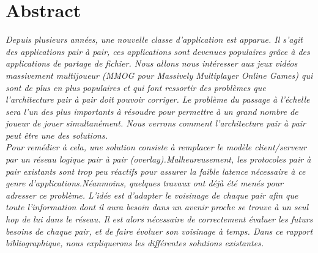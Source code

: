 \section{Abstract}
	\textit{Depuis plusieurs années, une nouvelle classe d'application est apparue. Il s'agit des applications pair à pair, ces applications sont devenues populaires grâce à des applications de partage de fichier. Nous allons nous intéresser aux jeux vidéos massivement multijoueur (MMOG pour Massively Multiplayer Online Games) qui sont de plus en plus populaires et qui font ressortir des problèmes que l'architecture pair à pair doit pouvoir corriger. Le problème du passage à l'échelle sera l'un des plus importants à résoudre pour permettre à un grand nombre de joueur de jouer simultanément. Nous verrons comment l'architecture pair à pair peut être une des solutions.\\ 
	Pour remédier à cela, une solution consiste à remplacer le modèle client/serveur par un réseau logique pair à pair (overlay).Malheureusement, les protocoles pair à pair existants sont trop peu réactifs pour assurer la faible latence nécessaire à ce genre d’applications.Néanmoins, quelques travaux ont déjà été menés pour adresser ce problème. L’idée est d’adapter le voisinage de chaque pair afin que toute l’information dont il aura besoin dans un avenir proche se trouve à un seul hop de lui dans le réseau. Il est alors nécessaire de correctement évaluer les futurs besoins de chaque pair, et de faire évoluer son voisinage à temps. Dans ce rapport bibliographique, nous expliquerons les différentes solutions existantes.}\\
